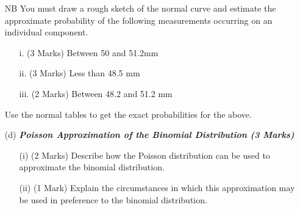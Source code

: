 \begin{itemize}
NB 	You must draw a rough sketch of the normal curve and estimate the approximate probability of the following measurements occurring on an individual component.
\begin{itemize}
\item [i.](3 Marks)	Between 50 and 51.2mm
\item [ii.](3 Marks) Less than 48.5 mm
\item [iii.](2 Marks) Between 48.2 and 51.2 mm
\end{itemize}

Use the normal tables to get the exact probabilities for the above.
						
	
\item[(d)] \textbf{\textit{Poisson Approximation of the Binomial Distribution (3 Marks)}}
\begin{itemize}
\item[(i)] (2 Marks) Describe how the Poisson distribution can be used to approximate the binomial distribution.
\item[(ii)] (1 Mark) Explain the circumstances in which this approximation may be used in preference to the binomial distribution.
\end{itemize}	
	
\end{itemize}						

